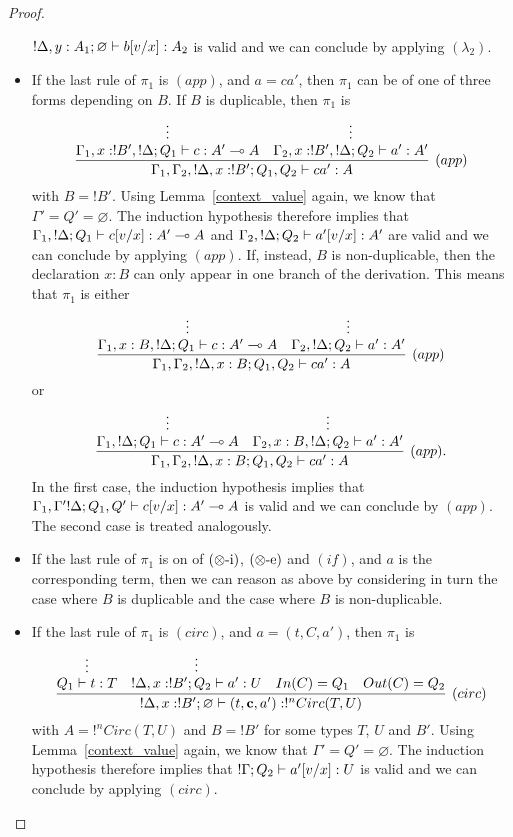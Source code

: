 \documentclass{article}
\begin{document}
\begin{proof}
\begin{itemize}
 $!\Delta,y:A_1;\varnothing \vdash b[v/x]:A_2$ is valid and we can conclude
 by applying $(\lambda_2)$.
 \item If the last rule of $\pi_1$ is $(app)$, and $a=ca'$, then $\pi_1$ can 
 be of one of three forms depending on $B$. If $B$ is duplicable, then $\pi_1$ is
 \[
 \infer[(app)]{\Gamma_1,\Gamma_2,!\Delta,x:!B';Q_1,Q_2\entails ca':A}{
    \deduce[]{\Gamma_1, x:!B',!\Delta;Q_1\entails c:A'\loli A}{
      \vdots
    }
    &
    \deduce[]{\Gamma_2, x:!B',!\Delta ;Q_2\entails a':A' }{
      \vdots
    }
 }
 \]
 with $B=!B'$. Using 
 Lemma~\hyperref[context_value]{\ref*{context_value}} again, we 
 know that $\Gamma'=Q'=\varnothing$. The induction hypothesis therefore 
 implies that $\Gamma_1,!\Delta;Q_1\vdash c[v/x]:A'\multimap A$ and 
 $\Gamma_2,!\Delta ;Q_2\vdash a'[v/x]:A'$ are valid and we can conclude 
 by applying $(app)$. If, instead, $B$ is non-duplicable, then the declaration 
 $x:B$ can only appear in one branch of the derivation. This means that $\pi_1$ 
 is either 
  \[
 \infer[(app)]{\Gamma_1,\Gamma_2,!\Delta,x:B;Q_1,Q_2\entails ca':A}{
    \deduce[]{\Gamma_1, x:B,!\Delta;Q_1\entails c:A'\loli A}{
      \vdots
    }
    &
    \deduce[]{\Gamma_2, !\Delta ;Q_2\entails a':A'}{
      \vdots
    }     
 }
 \]
 or
  \[
 \infer[(app).]{\Gamma_1,\Gamma_2,!\Delta,x:B;Q_1,Q_2\entails ca':A}{
    \deduce[]{\Gamma_1, !\Delta;Q_1\entails c:A'\loli A}{ 
      \vdots
    }
    &
    \deduce[]{\Gamma_2, x:B,!\Delta ;Q_2\entails a':A'}{
      \vdots
    }     
 }
 \]
 In the first case, the induction hypothesis implies that 
 $\Gamma_1,\Gamma' !\Delta;Q_1,Q'\vdash c[v/x]:A'\multimap A$ is valid and 
 we can conclude by $(app)$. The second case is treated analogously.
 \item If the last rule of $\pi_1$ is on of $(\otimes\mbox{-i})$, $(\otimes\mbox{-e})$ 
 and $(if)$, and $a$ is the corresponding term, then we can reason as above
 by considering in turn the case where $B$ is duplicable and the case where
 $B$ is non-duplicable.
 \item If the last rule of $\pi_1$ is $(circ)$, and $a=(t,C,a')$, then 
 $\pi_1$ is
 \[
 \infer[(circ)]{!\Delta,x:!B';\varnothing \entails (t,\mathbf{c},a'):!^nCirc(T,U)}{
    \deduce[]{Q_1\entails t:T}{
      \vdots
    }    
    &
    \deduce[]{!\Delta,x:!B' ; Q_2\entails a':U}{
      \vdots
    }     
    &
    In(C)=Q_1 
    &
    Out(C)=Q_2
 }
 \]
 with $A=!^nCirc(T,U)$ and $B=!B'$ for some types $T$, $U$ and $B'$. Using  
 Lemma~\hyperref[context_value]{\ref*{context_value}} again, we know 
 that $\Gamma'=Q'=\varnothing$. The induction hypothesis therefore implies that
 $!\Gamma; Q_2\vdash a'[v/x]:U$ is valid and we can conclude
 by applying $(circ)$.
\end{itemize}
\end{proof}
\end{document}
